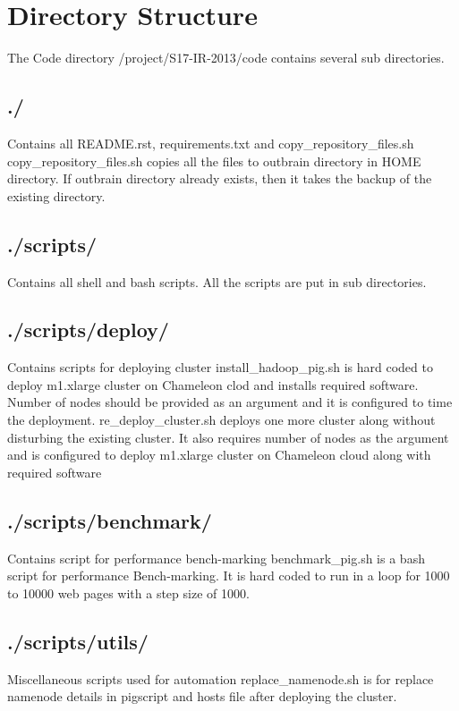 \documentclass[9pt,twocolumn,twoside]{../../styles/osajnl}
\begin{document}
\section{Directory Structure}
The Code directory /project/S17-IR-2013/code contains several sub directories. 
\subsection{./} Contains all README.rst, requirements.txt and copy\_repository\_files.sh
\newline copy\_repository\_files.sh copies all the files to outbrain directory in HOME directory. If outbrain directory already exists, then it takes the backup of the existing directory.
\subsection{./scripts/} Contains all shell and bash scripts. All the scripts are put in sub directories.
\subsection{./scripts/deploy/} Contains scripts for deploying cluster
\newline install\_hadoop\_pig.sh is hard coded to deploy m1.xlarge cluster on Chameleon clod and installs required software. Number of nodes should be provided as an argument and it is configured to time the deployment.
\newline re\_deploy\_cluster.sh deploys one more cluster along without disturbing the existing cluster. It also requires number of nodes as the argument and is configured to deploy m1.xlarge cluster on Chameleon cloud along with required software
\subsection{./scripts/benchmark/} Contains script for performance bench-marking
\newline benchmark\_pig.sh is a bash script for performance Bench-marking. It is hard coded to run in a loop for 1000 to 10000 web pages with a step size of 1000.
\subsection{./scripts/utils/} Miscellaneous scripts used for automation
\newline replace\_namenode.sh is for replace namenode details in pigscript and hosts file after deploying the cluster. 
\end{document}
